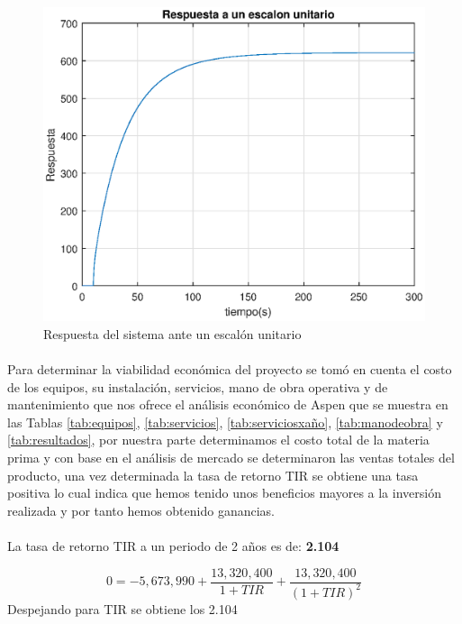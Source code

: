         \begin{figure}[H]
            \centering
            \includegraphics{images/unitarioM.eps}
            \caption{Respuesta del sistema ante un escalón unitario}
            \label{fig:unitario}
        \end{figure}

    \paragraph{}
    Para determinar la viabilidad económica del proyecto se tomó en cuenta el costo de los 
    equipos, su instalación, servicios, mano de obra operativa y de mantenimiento que nos 
    ofrece el análisis económico de Aspen que se muestra en las Tablas \ref{tab:equipos}, 
    \ref{tab:servicios}, \ref{tab:serviciosxaño}, \ref{tab:manodeobra} y \ref{tab:resultados}, 
    por nuestra parte determinamos el costo total de la materia prima y con base en el 
    análisis de mercado se determinaron las ventas totales del producto, una vez determinada 
    la tasa de retorno TIR se obtiene una tasa positiva lo cual indica que hemos tenido unos 
    beneficios mayores a la inversión realizada y por tanto hemos obtenido ganancias.
    \paragraph{}











    La tasa  de retorno TIR  a un periodo de 2 años es de:
    \textbf{2.104}

        $$0 = - 5,673,990 + \dfrac{13,320,400}{1+TIR} +\dfrac{13,320,400}{(1+TIR)^2}  $$
    Despejando para TIR se obtiene los 2.104 
